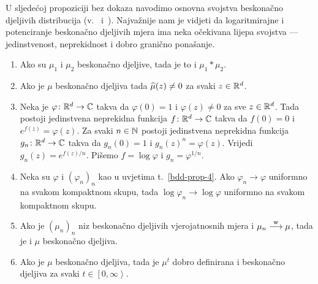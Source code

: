 \documentclass[main.tex]{subfiles}
\begin{document}
U sljedećoj propoziciji bez dokaza navodimo osnovna svojstva beskonačno djeljivih distribucija (v.~\cite[]{sato} i~\cite[,14]{sarapa}).
Najvažnije nam je vidjeti da logaritmirajne i potenciranje beskonačno djeljivih mjera ima neka očekivana lijepa svojstva --- jedinstvenost, neprekidnost i dobro granično ponašanje.
\begin{propozicija} \label{bdd-prop}
	\begin{enumerate}[label=(\roman*)]
		\item Ako su \( \mu_1 \) i \( \mu_2 \) beskonačno djeljive, tada je to i \( \mu_1 * \mu_2 \).
		\item Ako je \( \mu \) beskonačno djeljiva tada \( \widehat{\mu} (z) \neq 0 \) za svaki \( z \in \mathbb{R}^d \). \label{bdd-prop-2}
		\item Neka je \( \varphi \colon \mathbb{R}^d \to \mathbb{C} \) takva da \( \varphi(0) = 1 \) i \( \varphi(z) \neq 0 \) za sve \( z \in \mathbb{R}^d \).
		      Tada postoji jedinstvena neprekidna funkcija \( f \colon \mathbb{R}^d \to \mathbb{C} \) takva da \( f(0)=0 \) i \( e^{f(z)} = \varphi(z) \).
		      Za svaki \( n \in \mathbb{N} \) postoji jedinstvena neprekidna funkcija \( g_n \colon \mathbb{R}^d \to \mathbb{C} \) takva da \( g_n(0) = 1 \) i
		      \( g_n(z)^n = \varphi(z) \). Vrijedi \( g_n(z) = e^{f(z)/n} \). Pišemo \( f = \log \varphi \) i \( g_n = \varphi^{1/n} \). \label{bdd-prop-4}
		\item Neka su \( \varphi \) i \( (\varphi_n)_n \) kao u uvjetima t.~\ref{bdd-prop-4}. Ako \( \varphi_n \rightarrow \varphi \) uniformno
		      na svakom kompaktnom skupu, tada \( \log \varphi_n \rightarrow \log \varphi \) uniformno na svakom kompaktnom skupu.
		\item Ako je \( (\mu_n)_n \) niz beskonačno djeljivih vjerojatnosnih mjera i \( \mu_n \stackrel{\mathrm w}{\longrightarrow} \mu \), tada je i \( \mu \) beskonačno djeljiva.
		\item Ako je \( \mu \) beskonačno djeljiva, tada je \( \mu^t \) dobro definirana i beskonačno djeljiva za svaki \( t \in \left[ 0, \infty \right\rangle \). \label{bdd-prop-6}
	\end{enumerate}
\end{propozicija}
\end{document}
